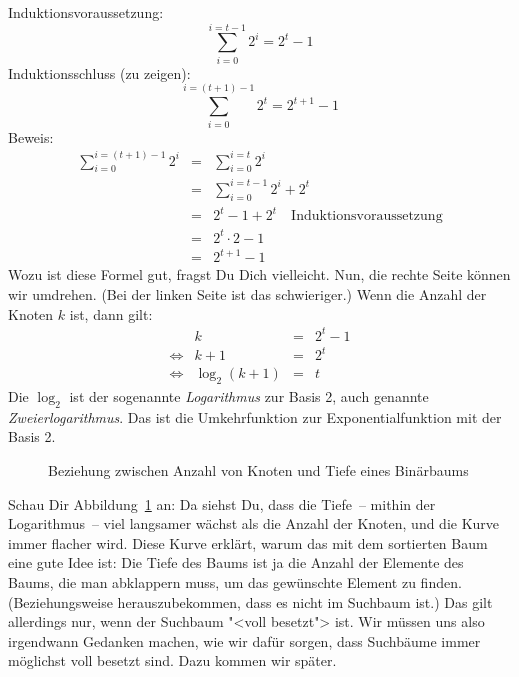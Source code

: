 \noindent Induktionsvoraussetzung:
\begin{displaymath}
  \sum_{i=0}^{i=t-1} 2^i  = 2^t-1
\end{displaymath}
%
Induktionsschluss (zu zeigen):
%
\begin{displaymath}
    \sum_{i=0}^{i=(t+1)-1} 2^t = 2^{t+1} - 1
\end{displaymath}
%
Beweis:
%
\begin{eqnarray*}
  \sum_{i=0}^{i=(t+1)-1} 2^i
  &=& \sum_{i=0}^{i=t} 2^i\\
  &=& \sum_{i=0}^{i=t-1} 2^i + 2^t\\
  &=& 2^t-1 + 2^t \quad\textrm{Induktionsvoraussetzung}\\
  &=& 2^t\cdot 2 - 1\\
  &=& 2^{t+1} - 1
\end{eqnarray*}
%
Wozu ist diese Formel gut, fragst Du Dich vielleicht.  Nun, die rechte
Seite können wir umdrehen.  (Bei der linken Seite ist das
schwieriger.) Wenn die Anzahl der Knoten $k$ ist, dann gilt:
%
\begin{displaymath}
  \begin{array}{lrcl}
    & k &=& 2^t - 1\\
    \Longleftrightarrow & k + 1 &=& 2^t\\
    \Longleftrightarrow & \log_2(k+1) &=& t
  \end{array}
\end{displaymath}
%
Die $\log_2$ ist der sogenannte
\textit{Logarithmus} zur Basis 2, auch genannte
\textit{Zweierlogarithmus}.  Das ist die
Umkehrfunktion zur Exponentialfunktion mit der Basis 2.

\begin{figure}[tb]
  \centering
{}
  \caption{Beziehung zwischen Anzahl von Knoten und Tiefe eines Binärbaums}
  \label{fig:log2}
\end{figure}

Schau Dir Abbildung~\ref{fig:log2} an: Da siehst Du, dass die Tiefe~--
mithin der Logarithmus~-- viel langsamer wächst als die Anzahl der
Knoten, und die Kurve immer flacher wird.  Diese Kurve erklärt, warum
das mit dem sortierten Baum eine gute Idee ist: Die Tiefe des Baums ist ja
die Anzahl der Elemente des Baums, die man abklappern muss, um das
gewünschte Element zu finden.  (Beziehungsweise herauszubekommen, dass
es nicht im Suchbaum ist.)  Das gilt allerdings nur, wenn der Suchbaum
"<voll besetzt"> ist.  Wir müssen uns also irgendwann Gedanken machen,
wie wir dafür sorgen, dass Suchbäume immer möglichst voll besetzt
sind.  Dazu kommen wir später.

